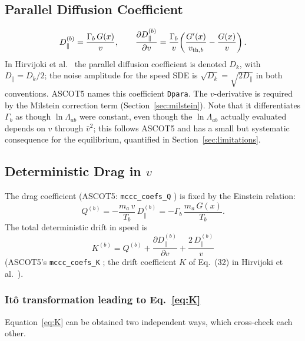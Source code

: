\documentclass[11pt]{article}
\newcommand{\vth}[1][]{v_{\mathrm{th}\ifx&#1&\else,#1\fi}}
\newcommand{\lnL}{\ln\Lambda}
\begin{document}
\subsection{Parallel Diffusion Coefficient}

\begin{equation}
  D_{\parallel}^{(b)} = \frac{\Gamma_b\,G(x)}{v},
  \qquad
  \frac{\partial D_{\parallel}^{(b)}}{\partial v}
  = \frac{\Gamma_b}{v}\!\left(\frac{G'(x)}{\vth[b]} - \frac{G(x)}{v}\right).
  \label{eq:Dpar}
\end{equation}
In Hirvijoki et al.\ \cite{hirvijoki2013} the parallel diffusion coefficient
is denoted $D_k$, with $D_{\parallel} = D_k/2$; the noise amplitude for the
speed SDE is $\sqrt{D_k} = \sqrt{2D_{\parallel}}$ in both conventions.
ASCOT5 names this coefficient \texttt{Dpara}.
The $v$-derivative is required by the Milstein correction term
(Section~\ref{sec:milstein}).  Note that it differentiates $\Gamma_b$ as
though $\lnL_{ab}$ were constant, even though the $\lnL_{ab}$ actually
evaluated depends on $v$ through $\bar v^2$; this follows ASCOT5 and has a
small but systematic consequence for the equilibrium, quantified in
Section~\ref{sec:limitations}.

\subsection{Deterministic Drag in $v$}

The drag coefficient (ASCOT5: \texttt{mccc\_coefs\_Q} \cite{ascot5code})
is fixed by the Einstein relation:
\begin{equation}
  Q^{(b)} = -\frac{m_a\,v}{T_b}\,D_{\parallel}^{(b)}
          = -\Gamma_b\,\frac{m_a\,G(x)}{T_b}.
  \label{eq:Q}
\end{equation}
The total deterministic drift in speed is
\begin{equation}
  K^{(b)}
  = Q^{(b)}
    + \frac{\partial D_{\parallel}^{(b)}}{\partial v}
    + \frac{2\,D_{\parallel}^{(b)}}{v}
    \label{eq:K}
\end{equation}
(ASCOT5's \texttt{mccc\_coefs\_K} \cite{ascot5code}; the drift coefficient
$K$ of Eq.~(32) in Hirvijoki et al.\ \cite{hirvijoki2013}).

\subsubsection*{It\^o transformation leading to Eq.~\eqref{eq:K}}

Equation~\eqref{eq:K} can be obtained two independent ways, which
cross-check each other.
\end{document}
